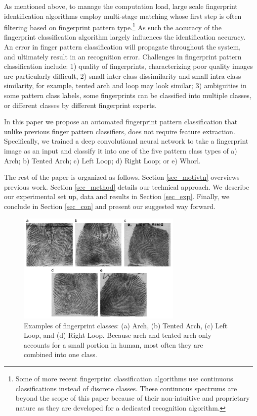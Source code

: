 As mentioned above, to manage the computation load, large scale fingerprint identification algorithms employ multi-stage matching whose first step is often filtering based on fingerprint pattern type.\footnote{Some of more recent fingerprint classification algorithms use continuous classifications instead of discrete classes. These continuous spectrums are beyond the scope of this paper because of their non-intuitive and proprietary nature as they are developed for a dedicated recognition algorithm.} As such the accuracy of the fingerprint classification algorithm largely influences the identification accuracy. An error in finger pattern classification will propagate throughout the system, and ultimately result in an recognition error. 
Challenges in fingerprint pattern classification include: 
%
1) quality of fingerprints, characterizing poor quality images are particularly difficult,
%
2) small inter-class dissimilarity and small intra-class similarity, for example, tented arch and loop may look similar; 
%
3) ambiguities in some pattern class labels, some fingerprints can be classified into multiple classes, or different classes by different fingerprint experts.

In this paper we propose an automated fingerprint pattern classification that unlike previous finger pattern classifiers, does not require feature extraction.  Specifically, we trained a deep convolutional neural network to take a fingerprint image as an input and classify it into one of the five pattern class types of a) Arch; b) Tented Arch; c) Left Loop; d) Right Loop; or e) Whorl. 

The rest of the paper is organized as follows.  Section \ref{sec_motivtn} overviews previous work. 
Section \ref{sec_method} details our technical approach. 
We describe our experimental set up, data and results in Section \ref{sec_exp}.
Finally, we conclude in Section \ref{sec_con} and present our suggested way forward.

\begin{figure}[!ht]
	\begin{center}
		\includegraphics[width=8cm]{fig/Fingerprint_classes.png}
	\end{center}
	\caption{Examples of fingerprint classes\cite{cao2013fingerprint}: (a) Arch, (b) Tented Arch,  (c) Left Loop, and  (d) Right Loop.  Because arch and tented arch only accounts for a small portion in human, most often they are combined into one class.} 
	\label{fig.fingerprint_classes}
\end{figure}


